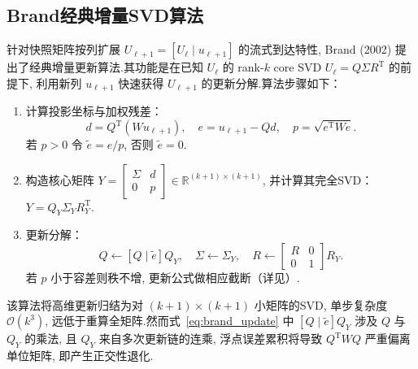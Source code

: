 \subsection{Brand经典增量SVD算法}
针对快照矩阵按列扩展 $U_{\ell+1}=[U_\ell\mid u_{\ell+1}]$ 的流式到达特性, Brand (2002) 提出了经典增量更新算法\cite{brand2002}.其功能是在已知 $U_\ell$ 的 rank-$k$ core SVD $U_\ell=Q\Sigma R^{\mathrm T}$ 的前提下, 利用新列 $u_{\ell+1}$ 快速获得 $U_{\ell+1}$ 的更新分解.算法步骤如下：
\begin{enumerate}
    \item 计算投影坐标与加权残差：
    \begin{equation}
    d=Q^{\mathrm T}(W u_{\ell+1}),\quad e=u_{\ell+1}-Q d,\quad p=\sqrt{e^{\mathrm T}W e}.
    \end{equation}
    若 $p>0$ 令 $\tilde e=e/p$, 否则 $\tilde e=0$.
    \item 构造核心矩阵 $Y=\begin{bmatrix}\Sigma & d\\0 & p\end{bmatrix}\in\mathbb{R}^{(k+1)\times(k+1)}$, 并计算其完全SVD：$Y=Q_Y\Sigma_Y R_Y^{\mathrm T}$.
    \item 更新分解：
    \begin{equation}
    Q \leftarrow [Q\mid\tilde e] Q_Y,\quad \Sigma\leftarrow\Sigma_Y,\quad R\leftarrow\begin{bmatrix}R & 0\\0 & 1\end{bmatrix}R_Y.
    \label{eq:brand_update}
    \end{equation}
    若 $p$ 小于容差则秩不增, 更新公式做相应截断（详见\cite{brand2002}）.
\end{enumerate}
该算法将高维更新归结为对 $(k+1)\times(k+1)$ 小矩阵的SVD, 单步复杂度 $\mathcal{O}(k^3)$, 远低于重算全矩阵.然而式~\eqref{eq:brand_update} 中 $[Q\mid\tilde e]Q_Y$ 涉及 $Q$ 与 $Q_Y$ 的乘法, 且 $Q_Y$ 来自多次更新链的连乘, 浮点误差累积将导致 $Q^{\mathrm T}WQ$ 严重偏离单位矩阵, 即产生正交性退化.

